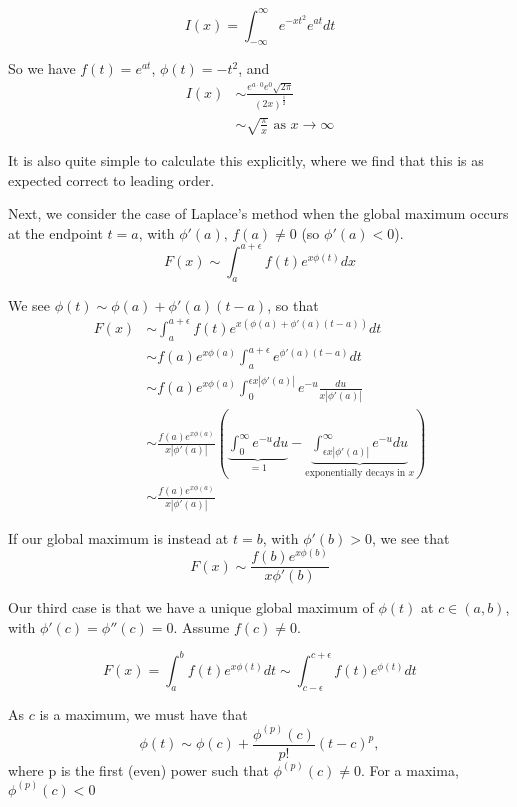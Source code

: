 \documentclass[a4paper]{article}
\begin{document}
\begin{eg}
	\[
		I(x) = \int_{-\infty}^{\infty} e^{-xt^2} e^{at} dt
	\]

	So we have $f(t) = e^{at}$, $\phi(t) = -t^2$, and
	\begin{align*}
		I(x) &\sim \frac{e^{a\cdot 0}e^{0} \sqrt{2\pi} }{(2x)^{\frac{1}{2}}} \\
			&\sim \sqrt{\frac{\pi}{x}} \text{ as } x\to \infty 
	\end{align*}

	It is also quite simple to calculate this explicitly, where we find that this is as expected correct to leading order.
\end{eg}

Next, we consider the case of Laplace's method when the global maximum occurs at the endpoint $t=a$, with $\phi'(a), \, f(a) \neq 0$ (so $\phi'(a) < 0$).
 \[
	 F(x) \sim \int_{a}^{a+\epsilon} f(t) e^{x\phi(t)} dx
\]

We see $\phi(t) \sim \phi(a) + \phi'(a) (t-a)$, so that
\begin{align*}
	F(x) &\sim  \int_{a}^{a+\epsilon} f(t) e^{x\left(\phi(a) + \phi'(a)(t-a)  \right) } dt \\
	&\sim f(a)e^{x\phi(a)} \int_{a}^{a+\epsilon} e^{\phi'(a)(t-a)}dt\\
	&\sim f(a)e^{x\phi(a)} \int_0^{\epsilon x |\phi'(a)|} e^{-u} \frac{du}{x |\phi'(a)|} \\
	&\sim  \frac{f(a)e^{x\phi(a)}}{x|\phi'(a)|}\left( \underbrace{\int_{0}^{\infty} e^{-u} du}_{=1} - \underbrace{\int_{\epsilon x|\phi'(a)|}^{\infty} e^{-u} du}_{\text{exponentially decays in $x$}} \right) \\
	&\sim \frac{f(a)e^{x\phi(a)}}{x|\phi'(a)|}
\end{align*}

\begin{remark}
	If our global maximum is instead at $t=b$, with $\phi'(b) >0$, we see that
	 \[
		 F(x) \sim \frac{f(b)e^{x\phi(b)}}{x\phi'(b)}
	\] 
\end{remark}

Our third case is that we have a unique global maximum of $\phi(t)$ at $c \in (a,b)$, with $\phi'(c) = \phi''(c) =0$. Assume  $f(c) \neq 0$.

\[
	F(x) = \int_{a}^{b} f(t) e^{x\phi(t)} dt \sim \int_{c-\epsilon}^{c+\epsilon} f(t) e^{\phi(t)}dt
\]

As $c$ is a maximum, we must have that
\[
	\phi(t) \sim \phi(c) + \frac{\phi^{(p)}(c)}{p!}(t-c)^{p}
,\] where p is the first (even) power such that $\phi^{(p)}(c) \neq 0$. For a maxima, $\phi^{(p)}(c) < 0$
\end{document}
